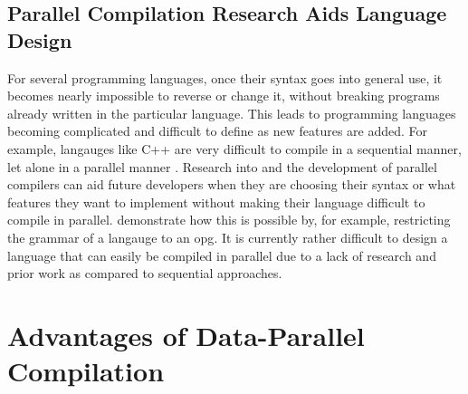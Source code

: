 \subsection{Parallel Compilation Research Aids Language Design}

For several programming languages, once their syntax goes into general
use, it becomes nearly impossible to reverse or change it, without breaking
programs already written in the particular language. This leads to programming
languages becoming complicated and difficult to define as new features are
added. For example, langauges like C++ are very difficult to compile in a
sequential manner, let alone in a parallel manner \citep{noauthor_most_2022,
noauthor_difficulties_nodate}. Research into and the development of parallel
compilers can aid future developers when they are choosing their syntax or
what features they want to implement without making their language difficult
to compile in parallel. \cite{barenghi_parallel_2015} demonstrate how this is
possible by, for example, restricting the grammar of a langauge to an \gls{opg}.
It is currently rather difficult to design a language that can easily be
compiled in parallel due to a lack of research and prior work as compared to
sequential approaches.

\section{Advantages of Data-Parallel Compilation} \label{advantages_of_data_p_comp}


